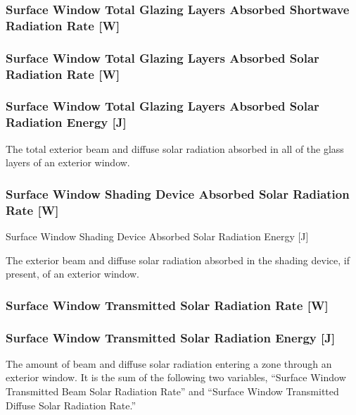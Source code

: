 \subsubsection{Surface Window Total Glazing Layers Absorbed Shortwave Radiation Rate {[}W{]}}\label{surface-window-total-glazing-layers-absorbed-shortwave-radiation-rate-w}

\subsubsection{Surface Window Total Glazing Layers Absorbed Solar Radiation Rate {[}W{]}}\label{surface-window-total-glazing-layers-absorbed-solar-radiation-rate-w}

\subsubsection{Surface Window Total Glazing Layers Absorbed Solar Radiation Energy {[}J{]}}\label{surface-window-total-glazing-layers-absorbed-solar-radiation-energy-j}

The total exterior beam and diffuse solar radiation absorbed in all of the glass layers of an exterior window.

\subsubsection{Surface Window Shading Device Absorbed Solar Radiation Rate {[}W{]}}\label{surface-window-shading-device-absorbed-solar-radiation-rate-w}

Surface Window Shading Device Absorbed Solar Radiation Energy {[}J{]}

The exterior beam and diffuse solar radiation absorbed in the shading device, if present, of an exterior window.

\subsubsection{Surface Window Transmitted Solar Radiation Rate {[}W{]}}\label{surface-window-transmitted-solar-radiation-rate-w}

\subsubsection{Surface Window Transmitted Solar Radiation Energy {[}J{]}}\label{surface-window-transmitted-solar-radiation-energy-j}

The amount of beam and diffuse solar radiation entering a zone through an exterior window. It is the sum of the following two variables, ``Surface Window Transmitted Beam Solar Radiation Rate'' and ``Surface Window Transmitted Diffuse Solar Radiation Rate.''

